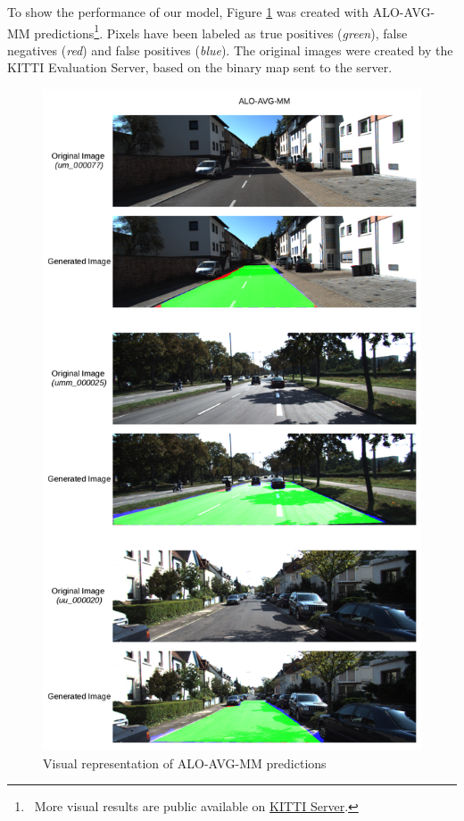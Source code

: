 To show the performance of our model, Figure \ref{fig:kitti_representacao_visual} was created with ALO-AVG-MM predictions\footnote{~More visual results are public available on \href{http://www.cvlibs.net/datasets/kitti/eval_road_detail.php?result=a5ca173550cb383caf3e12ca236d7c809489d2d9}{KITTI Server}.}.
Pixels have been labeled as true positives (\textit{green}), false negatives (\textit{red}) and false positives (\textit{blue}).
The original images were created by the KITTI Evaluation Server, based on the binary map sent to the server.

\begin{figure}
  \centering
  \includegraphics[width=1\columnwidth]{../imagens/ilustracoes/cap6_kitti_visual_representation.png} %
  \caption{Visual representation of ALO-AVG-MM predictions}
  \label{fig:kitti_representacao_visual}
\end{figure}
